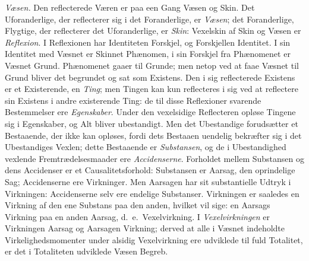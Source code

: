 \documentclass[12pt]{book}
\newcommand{\apage}[1]{\marginnote{\footnotesize\textit{[#1]}}}
\begin{document}
\emph{Væsen.} Den reflecterede Væren er paa een Gang Væsen og Skin. Det
Uforanderlige, der reflecterer sig i det Foranderlige, er \emph{Væsen}; det
Foranderlige, Flygtige, der reflecterer det Uforanderlige, er \emph{Skin}:
Vexelskin af Skin og Væsen er \emph{Reflexion}. I Reflexionen har Identiteten
Forskjel, og Forskjellen Identitet. I sin Identitet med Væsnet er Skinnet
Phænomen, i sin Forskjel fra Phænomenet er Væsnet Grund. Phænomenet gaaer
til Grunde; men netop ved at faae Væsnet til Grund bliver det begrundet og
sat som Existens. Den i sig reflecterede Existens er et Existerende, en
\emph{Ting}; men Tingen kan kun reflecteres i sig ved at reflectere sin Existens i
andre existerende Ting: de til disse Reflexioner svarende Bestemmelser ere
\emph{Egenskaber}. Under den vexelsidige Reflecteren opløse Tingene sig i
Egenskaber, og Alt bliver ubestandigt. Men det Ubestandige forudsætter et
Bestaaende, der ikke kan opløses, fordi dets Bestaaen uendelig bekræfter
sig i det Ubestandiges Vexlen; dette Bestaaende er \emph{Substansen}, og de i
Ubestandighed vexlende Fremtrædelsesmaader ere \emph{Accidenserne}. Forholdet
mellem Substansen og dens Accidenser er et Causalitetsforhold: Substansen
er Aarsag, den \apage{103} oprindelige Sag; Accidenserne ere Virkninger. Men Aarsagen
har sit substantielle Udtryk i Virkningen: Accidenserne selv ere endelige
Substanser. Virkningen er saaledes en Virkning af den ene Substans paa den
anden, hvilket vil sige: en Aarsags Virkning paa en anden Aarsag, d.\ e.\
Vexelvirkning. I \emph{Vexelvirkningen} er Virkningen Aarsag og Aarsagen Virkning;
derved at alle i Væsnet indeholdte Virkelighedsmomenter under alsidig
Vexelvirkning ere udviklede til fuld Totalitet, er det i Totaliteten
udviklede Væsen Begreb.
\end{document}
